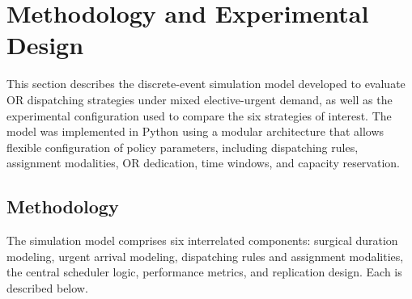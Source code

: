 \documentclass[sn-mathphys-num]{sn-jnl}
\begin{document}
\section{Methodology and Experimental Design}\label{sec:method}

This section describes the discrete-event simulation model developed to
evaluate OR dispatching strategies under mixed elective-urgent demand, as
well as the experimental configuration used to compare the six strategies
of interest. The model was implemented in Python using a modular
architecture that allows flexible configuration of policy parameters,
including dispatching rules, assignment modalities, OR dedication, time
windows, and capacity reservation.

\subsection{Methodology}
The simulation model comprises six interrelated components: surgical
duration modeling, urgent arrival modeling, dispatching rules and
assignment modalities, the central scheduler logic, performance metrics,
and replication design. Each is described below.
\end{document}
